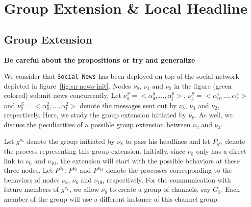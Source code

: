 \section{Group Extension \& Local Headline} %
\label{sec:group_extension_local_headline}

\subsection{Group Extension} %
\label{sub:group_extension}

\textbf{Be careful about the propositions or try and generalize}

We consider that {\tt Social News} has been deployed on top of the social network depicted in
figure~\ref{fig:sn-news-init}. Nodes $\nu_8$, $\nu_4$ and $\nu_2$ in the figure (green colored) submit news concurrently.
Let $\nu_8^S=<\alpha_0^8,\ldots,\alpha_\jmath^8>$, $\nu_4^S=<\alpha_0^4,\ldots,\alpha_\ell^4>$ and
$\nu_2^S=<\alpha_0^2,\ldots,\alpha_\imath^2>$ denote the messages sent out by $\nu_8$, $\nu_4$ and $\nu_2$, respectively.
Here, we study the group extension initiated by $\nu_8$. As well, we discuss the peculiarities of a possible group
extension between $\nu_2$ and $\nu_4$.

Let $g^{\nu_8}$ denote the group initiated by $\nu_8$ to pass his headlines and let $P_{g^{\nu_8}}$ denote the process
representing this group extension. Initially, since $\nu_8$ only has a direct link to $\nu_6$ and $\nu_{10}$, the
extension will start with the possible behaviors at these three nodes. Let $P^{\nu_8}$, $P^{\nu_6}$ and $P^{\nu_{10}}$
denote the processes corresponding to the behaviors of nodes $\nu_8$, $\nu_6$ and $\nu_{10}$, respectively. For the
communication with future members of $g^{\nu_8}$, we allow $\nu_8$ to create a group of channels, say $G_8$. Each member
of the group will use a different instance of this channel group.

